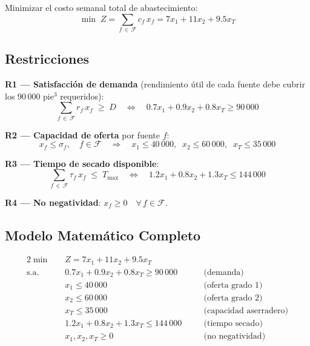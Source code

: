 \documentclass[12pt,a4paper]{article}
\newcommand{\cset}[1]{\mathcal{#1}}            %
\begin{document}
\begin{fobox}
Minimizar el costo semanal total de abastecimiento:
\[
  \min\; Z = \sum_{f\,\in\,\cset{F}} c_f\,x_f = 7x_1 + 11x_2 + 9.5x_T
\]
\end{fobox}

\subsection{Restricciones}

\begin{restbox}
\textbf{R1 — Satisfacción de demanda}
(rendimiento útil de cada fuente debe cubrir los 90\,000 pie$^3$ requeridos):
\[
  \sum_{f\,\in\,\cset{F}} r_f\,x_f \;\geq\; D
  \quad\Leftrightarrow\quad
  0.7x_1 + 0.9x_2 + 0.8x_T \geq 90\,000
\]

\textbf{R2 — Capacidad de oferta} por fuente $f$:
\[
  x_f \leq \sigma_f, \quad f \in \cset{F}
  \quad\Rightarrow\quad
  x_1 \leq 40\,000,\;\; x_2 \leq 60\,000,\;\; x_T \leq 35\,000
\]

\textbf{R3 — Tiempo de secado disponible}:
\[
  \sum_{f\,\in\,\cset{F}} \tau_f\,x_f \;\leq\; T_{\max}
  \quad\Leftrightarrow\quad
  1.2x_1 + 0.8x_2 + 1.3x_T \leq 144\,000
\]

\textbf{R4 — No negatividad}: $x_f \geq 0 \quad \forall\,f \in \cset{F}$.
\end{restbox}

\subsection{Modelo Matemático Completo}

\begin{modelbox}
\begin{alignat*}{2}
  \min\quad & Z = 7x_1 + 11x_2 + 9.5x_T\\[4pt]
  \text{s.a.}\quad
  & 0.7x_1 + 0.9x_2 + 0.8x_T \geq 90\,000 &\quad& \text{(demanda)}\\
  & x_1 \leq 40\,000 &\quad& \text{(oferta grado 1)}\\
  & x_2 \leq 60\,000 &\quad& \text{(oferta grado 2)}\\
  & x_T \leq 35\,000 &\quad& \text{(capacidad aserradero)}\\
  & 1.2x_1 + 0.8x_2 + 1.3x_T \leq 144\,000 &\quad& \text{(tiempo secado)}\\
  & x_1, x_2, x_T \geq 0 &\quad& \text{(no negatividad)}
\end{alignat*}
\end{modelbox}
\end{document}
